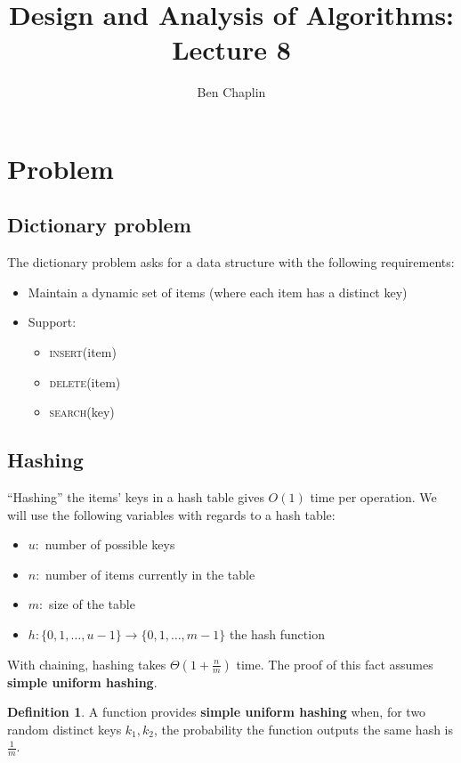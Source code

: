 \documentclass[11pt]{article}
\title{Design and Analysis of Algorithms: Lecture 8}
\author{Ben Chaplin}
\date{}
\theoremstyle{plain}
\theoremstyle{definition}
\newtheorem*{defn}{Definition}
\begin{document}
\maketitle
\tableofcontents

\section{Problem}
\subsection{Dictionary problem}

The dictionary problem asks for a data structure with the following requirements:
\begin{itemize}
    \item Maintain a dynamic set of items (where each item has a distinct key)
    \item Support:
        \begin{itemize}
            \item \textsc{insert}(item)
            \item \textsc{delete}(item)
            \item \textsc{search}(key)
        \end{itemize}
\end{itemize}

\subsection{Hashing}

``Hashing'' the items' keys in a hash table gives $O(1)$ time per operation. We will use the
following variables with regards to a hash table:
\begin{itemize}
    \item $u:$ number of possible keys 
    \item $n:$ number of items currently in the table
    \item $m:$ size of the table
    \item $h: \{0, 1, \ldots, u-1\} \rightarrow \{0, 1, \ldots, m-1\}$ the hash function
\end{itemize}

With chaining, hashing takes $\Theta(1 + \frac{n}{m})$ time. The proof of this fact assumes 
\textbf{simple uniform hashing}.

\begin{defn}
    A function provides \textbf{simple uniform hashing} when, for two random distinct keys 
    $k_1, k_2$, the probability the function outputs the same hash is $\displaystyle\frac{1}{m}$.
\end{defn}
\end{document}
